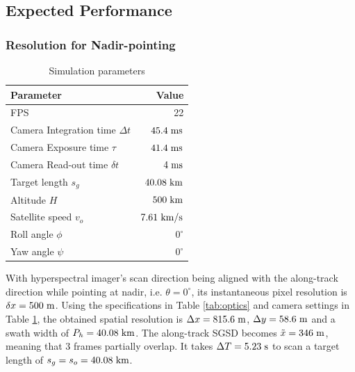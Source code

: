\subsection{Expected Performance}
\subsubsection{Resolution for Nadir-pointing} \label{sec:spacecraft_nadir} 
\begin{table}[htbp]
	\caption{Simulation parameters}
	\label{tab:camera_params}
	\centering
			\begin{tabular}{l r}
				\hline
                Parameter & Value \\
                \hline
                FPS & 22 \\ 
                Camera Integration time $\Delta t$ & $45.4 \hspace{3pt} \rm{ms}$ \\
                Camera Exposure time $\tau$ & $41.4 \hspace{3pt} \rm{ms}$ \\
                Camera Read-out time $\delta t$ & $4 \hspace{3pt} \rm{ms}$ \\
                Target length $s_g$ & $40.08 \hspace{3pt} \rm{km}$ \\
                Altitude $H$ & $500 \hspace{3pt} \rm{km}$ \\
                Satellite speed $v_o$ & $7.61 \hspace{3pt} \rm{km/s}$ \\
                Roll angle $\phi$ & $0^{\circ}$ \\
                Yaw angle $\psi$ & $0^{\circ}$ \\
				\hline
				\end{tabular}
\end{table}
With hyperspectral imager's scan direction being aligned with the along-track direction while pointing at nadir, i.e. $\theta=0^{\circ}$, its instantaneous pixel resolution is $\delta x =500 \hspace{3pt} \rm{m}$. Using the specifications in Table \ref{tab:optics} and camera settings in Table \ref{tab:camera_params}, the obtained spatial resolution is $\Delta x = 815.6 \hspace{3pt} \rm{m}$, $\Delta y =58.6 \hspace{3pt} \rm{m}$ and a swath width of $P_{h}=40.08 \hspace{3pt} \rm{km}$. The along-track SGSD becomes $\tilde{x} =346 \hspace{3pt} \rm{m}$, meaning that $3$ frames partially overlap. It takes $\Delta T = 5.23 \hspace{3pt} \rm{s}$ to scan a target length of $s_g=s_o=40.08 \hspace{3pt} \rm{km}$.
